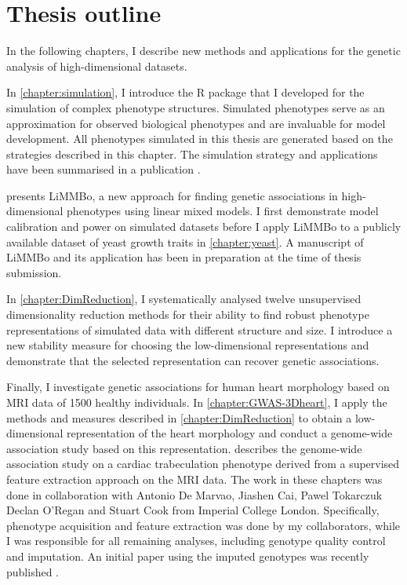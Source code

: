 \section{Thesis outline}
In the following chapters, I describe new methods and applications for the genetic analysis of high-dimensional datasets. 

In \cref{chapter:simulation}, I introduce the R package that I developed for the simulation of complex phenotype structures. Simulated phenotypes serve as an approximation for observed biological phenotypes and are invaluable for model development. All phenotypes simulated in this thesis are generated based on the strategies described in this chapter. The simulation strategy and applications have been summarised in a publication \citep[\textit{under revision}]{Meyer2017a}.

 presents LiMMBo, a new approach for finding genetic associations in high-dimensional phenotypes using linear mixed models. I first demonstrate model calibration and power on simulated datasets before I apply LiMMBo to a publicly available dataset of yeast growth traits in \cref{chapter:yeast}. A manuscript of LiMMBo and its application has been in preparation at the time of thesis submission.

In \cref{chapter:DimReduction}, I systematically analysed twelve unsupervised dimensionality reduction methods for their ability to find robust phenotype representations of simulated data with different structure and size. I introduce a new stability measure for choosing the low-dimensional representations and demonstrate that the selected representation can recover genetic associations.

Finally, I investigate genetic associations for human heart morphology based on MRI data of \num{1500} healthy individuals. In \cref{chapter:GWAS-3Dheart}, I apply the methods and measures described in  \cref{chapter:DimReduction} to obtain a low-dimensional representation of the heart morphology and conduct a genome-wide association study based on this representation.  describes the genome-wide association study on a cardiac trabeculation phenotype derived from a supervised feature extraction approach on the MRI data.  The work in these chapters was done in collaboration with Antonio De Marvao, Jiashen Cai, Pawel Tokarczuk Declan O'Regan and Stuart Cook from Imperial College London. Specifically, phenotype acquisition and feature extraction was done by my collaborators, while I was responsible for all remaining analyses, including genotype quality control and imputation. An initial paper using the imputed genotypes was recently published \citep{Biffi2017}.





